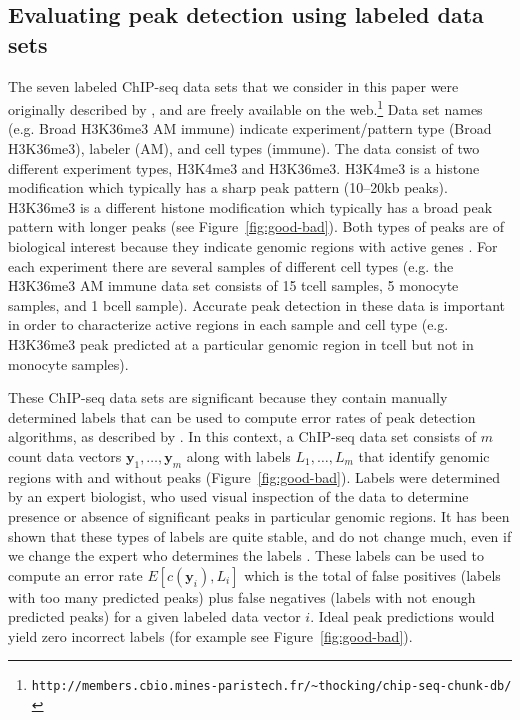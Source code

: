 \documentclass[aoas]{imsart}
\begin{document}
\subsection{Evaluating peak detection using labeled data sets}

The seven labeled ChIP-seq data sets that we consider in this paper were originally
described by \citet{HOCKING2016-chipseq}, and are freely available on
the
web.\footnote{\verb|http://members.cbio.mines-paristech.fr/~thocking/chip-seq-chunk-db/|}
Data set names (e.g. Broad H3K36me3 AM immune) indicate
experiment/pattern type (Broad H3K36me3), labeler (AM), and cell types
(immune). The data consist of two different experiment types, H3K4me3
and H3K36me3. H3K4me3 is a histone modification which typically has a
sharp peak pattern (10--20kb peaks). H3K36me3 is a different histone
modification which typically has a broad peak pattern with longer
peaks (see Figure~\ref{fig:good-bad}). Both types of peaks are of
biological interest because they indicate genomic regions with active
genes \citep{histone-review}. For each experiment there are several samples of different
cell types (e.g. the H3K36me3 AM immune data set consists of 15 tcell
samples, 5 monocyte samples, and 1 bcell sample). Accurate peak
detection in these data is important in order to characterize active
regions in each sample and cell type (e.g. H3K36me3 peak predicted at
a particular genomic region in tcell but not in monocyte samples).

These ChIP-seq data sets are significant because they contain manually
determined labels that can be used to compute error rates of peak
detection algorithms, as described by \citet{HOCKING2016-chipseq}. In
this context, a ChIP-seq data set consists of $m$ count data vectors
$\mathbf y_1,\dots,\mathbf y_m$ along with labels $L_1,\dots, L_m$
that identify genomic regions with and without peaks
(Figure~\ref{fig:good-bad}). Labels were determined by an expert
biologist, who used visual inspection of the data to determine
presence or absence of significant peaks in particular genomic
regions. It has been shown that these types of labels are quite
stable, and do not change much, even if we change the expert who
determines the labels \citep{HOCKING2016-chipseq}. These labels can
be used to compute an error rate $E[c(\mathbf y_i), L_i]$ which is the
total of false positives (labels with too many predicted peaks) plus
false negatives (labels with not enough predicted peaks) for a given
labeled data vector $i$. Ideal peak predictions would yield zero
incorrect labels (for example see Figure~\ref{fig:good-bad}).
\end{document}
